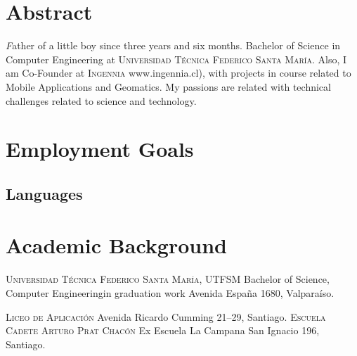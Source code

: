 \documentclass[11pt,letterpaper,roman]{moderncv}
\begin{document}
\maketitle

\section*{\textbf{Abstract}} \textsl Father of a little boy since three years
and six months. Bachelor of Science in Computer Engineering at
\textsc{Universidad Técnica Federico Santa María}. Also, I am Co-Founder at
\textsc{Ingennia} www.ingennia.cl), with projects in course related to Mobile
Applications and Geomatics. My passions are related with technical challenges
related to science and technology.
\section{Employment Goals} 

\subsection{Languages} 


\section{Academic Background}
	{\textsc{Universidad T\'ecnica Federico Santa Mar\'ia, UTFSM}}
	{Bachelor of Science, Computer Engineering}{in graduation work}
	{}
	{Avenida España 1680, Valparaíso.}

	{\textsc{Liceo de Aplicaci\'on}}
	{}
	{}
	{}
	{Avenida Ricardo Cumming 21--29, Santiago.}
	{\textsc{Escuela Cadete Arturo Prat Chac\'on}}
	{Ex Escuela La Campana}
	{}
	{}
	{San Ignacio 196, Santiago.}
\end{document}
